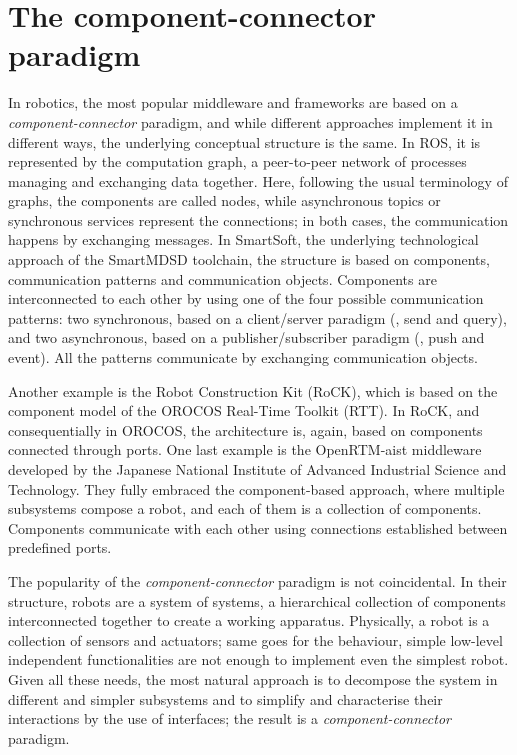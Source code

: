 \minitoc
\newpage

\section[The component-connector paradigm]{The component-connector \\paradigm}
\label{sec:cnc}
In robotics, the most popular middleware and frameworks are based on a \textit{component-connector} paradigm, and while different approaches implement it in different ways, the underlying conceptual structure is the same. In ROS, it is represented by the computation graph, a peer-to-peer network of processes managing and exchanging data together. Here, following the usual terminology of graphs, the components are called nodes, while asynchronous topics or synchronous services represent the connections; in both cases, the communication happens by exchanging messages. In SmartSoft, the underlying technological approach of the SmartMDSD toolchain, the structure is based on components, communication patterns and communication objects. Components are interconnected to each other by using one of the four possible communication patterns: two synchronous, based on a client/server paradigm (\ie, send and query), and two asynchronous, based on a publisher/subscriber paradigm (\ie, push and event). All the patterns communicate by exchanging communication objects.

Another example is the Robot Construction Kit (RoCK), which is based on the component model of the OROCOS Real-Time Toolkit (RTT). In RoCK, and consequentially in OROCOS, the architecture is, again, based on components connected through ports. One last example is the OpenRTM-aist middleware developed by the Japanese National Institute of Advanced Industrial Science and Technology. They fully embraced the component-based approach, where multiple subsystems compose a robot, and each of them is a collection of components. Components communicate with each other using connections established between predefined ports.

The popularity of the \textit{component-connector} paradigm is not coincidental. In their structure, robots are a system of systems, a hierarchical collection of components interconnected together to create a working apparatus. Physically, a robot is a collection of sensors and actuators; same goes for the behaviour, simple low-level independent functionalities are not enough to implement even the simplest robot. Given all these needs, the most natural approach is to decompose the system in different and simpler subsystems and to simplify and characterise their interactions by the use of interfaces; the result is a \textit{component-connector} paradigm. 

